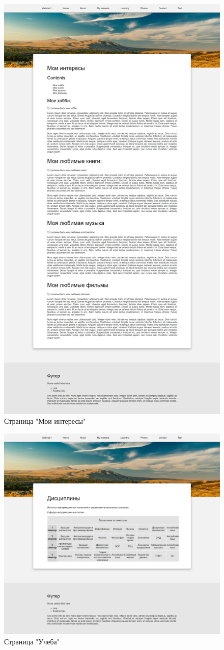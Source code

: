 \documentclass[a4paper,14pt]{extarticle}
\begin{document}
\begin{figure}[H]
    \centering
    \includegraphics[width=.8\linewidth]{../images/interests}
    \caption{Страница "Мои интересы"}
    \label{fig:interests}
\end{figure}
\begin{figure}[H]
    \centering
    \includegraphics[width=.8\linewidth]{../images/learning}
    \caption{Страница "Учеба"}
    \label{fig:learning}
\end{figure}
\end{document}
